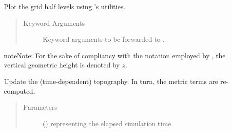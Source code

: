 \documentclass[letterpaper,10pt,english]{sphinxmanual}
\begin{document}
\begin{fulllineitems}
\begin{fulllineitems}
\label{\detokenize{api:tasmania.grids.sigma.Sigma2d.plot}}
Plot the grid half levels using ’s utilities.
\begin{quote}\begin{description}
\item[{Keyword Arguments}] \leavevmode
{} \textendash{} Keyword arguments to be forwarded to .

\end{description}\end{quote}

\begin{sphinxadmonition}{note}{Note:}
For the sake of compliancy with the notation employed by ,
the vertical geometric height is denoted by \(z\).
\end{sphinxadmonition}

\end{fulllineitems}


\begin{fulllineitems}
\label{\detokenize{api:tasmania.grids.sigma.Sigma2d.update_topography}}
Update the (time-dependent) topography. In turn, the metric terms are re-computed.
\begin{quote}\begin{description}
\item[{Parameters}] \leavevmode
{} () \textendash{}  representing the elapsed simulation time.

\end{description}\end{quote}

\end{fulllineitems}


\end{fulllineitems}

\end{document}
